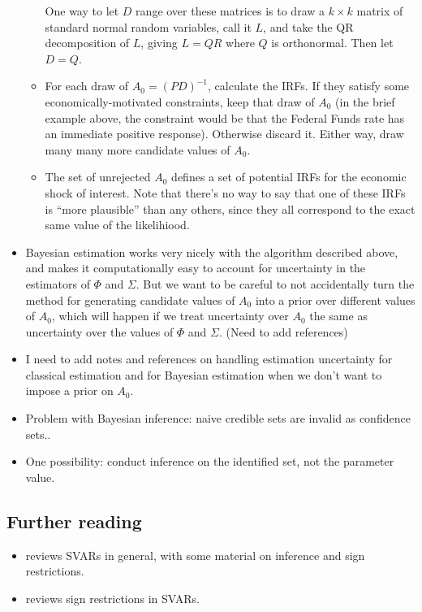 \begin{itemize}
\begin{itemize}
    One way to let $D$ range over these matrices is to draw a $k×k$
    matrix of standard normal random variables, call it $L$, and take
    the QR decomposition of $L$, giving $L=QR$ where $Q$ is
    orthonormal.  Then let $D=Q$.
  \item For each draw of $A_0=(PD)^{-1}$, calculate the IRFs.  If they
    satisfy some economically-motivated constraints, keep that draw of
    $A_0$ (in the brief example above, the constraint would be that the
    Federal Funds rate has an immediate positive response).  Otherwise
    discard it.  Either way, draw many many more candidate values of
    $A_0$.
  \item The set of unrejected $A_0$ defines a set of potential IRFs for
    the economic shock of interest.  Note that there's no way to say
    that one of these IRFs is ``more plausible'' than any others,
    since they all correspond to the exact same value of the
    likelihiood.
  \end{itemize}
\item Bayesian estimation works very nicely with the algorithm
  described above, and makes it computationally easy to account for
  uncertainty in the estimators of $\Phi$ and $\Sigma$.  But we want to be
  careful to not accidentally turn the method for generating candidate
  values of $A_0$ into a prior over different values of $A_0$, which
  will happen if we treat uncertainty over $A_0$ the same as
  uncertainty over the values of $\Phi$ and $\Sigma$.  (Need to add references)
\item I need to add notes and references on handling estimation
  uncertainty for classical estimation and for Bayesian estimation
  when we don't want to impose a prior on $A_0$.
\item Problem with Bayesian inference: naive credible sets are invalid
  as confidence sets.\cite{MS12}.
\item One possibility: conduct inference on the identified set, not
  the parameter value.\cite{KT13}
\end{itemize}

\subsection{Further reading}
\begin{itemize}
\item \citep{Ki13} reviews SVARs in general, with some material on inference and sign restrictions.
\item \citep{FP11} reviews sign restrictions in SVARs.
\end{itemize}

